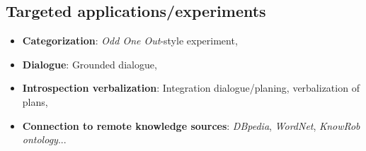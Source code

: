 \subsection{Targeted applications/experiments}
\label{sect|targeted-applications-experiments}

\begin{itemize}
	\item \textbf{Categorization}: \emph{Odd One Out}-style experiment,
	\item \textbf{Dialogue}: Grounded dialogue,
	\item \textbf{Introspection verbalization}: Integration dialogue/planing, verbalization of plans,
	\item \textbf{Connection to remote knowledge sources}: \emph{DBpedia}, \emph{WordNet}, \emph{KnowRob ontology}...
\end{itemize}

